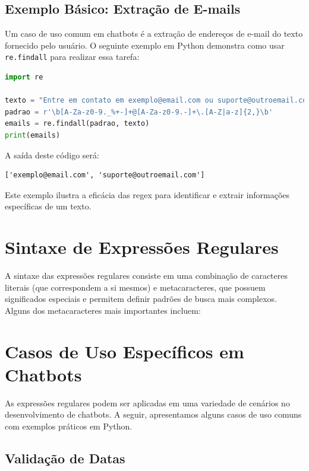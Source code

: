 \documentclass[14pt,a4paper,oneside]{book}
\begin{document}
\subsection{Exemplo Básico: Extração de E-mails}

Um caso de uso comum em chatbots é a extração de endereços de e-mail do texto fornecido pelo usuário. O seguinte exemplo em Python demonstra como usar \texttt{re.findall} para realizar essa tarefa:
\begin{lstlisting}[language=Python, caption=Extração de e-mails com regex, label=lst:extracao_email]
import re

texto = "Entre em contato em exemplo@email.com ou suporte@outroemail.com."
padrao = r'\b[A-Za-z0-9._%+-]+@[A-Za-z0-9.-]+\.[A-Z|a-z]{2,}\b'
emails = re.findall(padrao, texto)
print(emails)
\end{lstlisting}

A saída deste código será:

\begin{verbatim}
['exemplo@email.com', 'suporte@outroemail.com']
\end{verbatim}

Este exemplo ilustra a eficácia das regex para identificar e extrair informações específicas de um texto.

\section{Sintaxe de Expressões Regulares}

A sintaxe das expressões regulares consiste em uma combinação de caracteres literais (que correspondem a si mesmos) e metacaracteres, que possuem significados especiais e permitem definir padrões de busca mais complexos. Alguns dos metacaracteres mais importantes incluem:


\section{Casos de Uso Específicos em Chatbots}

As expressões regulares podem ser aplicadas em uma variedade de cenários no desenvolvimento de chatbots. A seguir, apresentamos alguns casos de uso comuns com exemplos práticos em Python.

\subsection{Validação de Datas}
\end{document}
